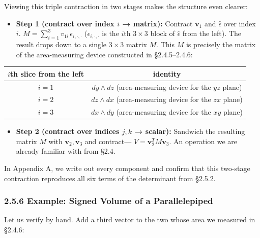 \documentclass[a4paper,12pt,openany]{book}
\providecommand{\tightlist}{%
  \setlength{\itemsep}{0pt}\setlength{\parskip}{0pt}}
\begin{document}
Viewing this triple contraction in two stages makes the structure even
clearer:

\begin{itemize}
\tightlist
\item
  \textbf{Step 1 (contract over index $i$ → matrix):} Contract
  \(\mathbf{v}_1\) and \(\widehat{\epsilon}\) over index \(i\).
  \(\displaystyle M = \sum_{i=1}^3 v_{1i}\,\epsilon_{i,\cdot,\cdot}\)
  (\(\epsilon_{i,\cdot,\cdot}\) is the \(i\)th \(3 \times 3\) block of
  \(\widehat{\epsilon}\) from the left). The result drops down to a
  single \(3 \times 3\) matrix \(M\). This \(M\) is precisely the matrix
  of the area-measuring device constructed in §2.4.5–2.4.6:
\end{itemize}

\begin{longtable}[]{@{}cc@{}}
\toprule\noalign{}
\(i\)th slice from the left & identity \\
\midrule\noalign{}
\endhead
\bottomrule\noalign{}
\endlastfoot
\(i=1\) & \(dy \wedge dz\) (area-measuring device for the \(yz\)
plane) \\
\(i=2\) & \(dz \wedge dx\) (area-measuring device for the \(zx\)
plane) \\
\(i=3\) & \(dx \wedge dy\) (area-measuring device for the \(xy\)
plane) \\
\end{longtable}

\begin{itemize}
\tightlist
\item
  \textbf{Step 2 (contract over indices $j,k$ → scalar):} Sandwich the
  resulting matrix \(M\) with \(\mathbf{v}_2, \mathbf{v}_3\) and
  contract— \(V = \mathbf{v}_2^T M \mathbf{v}_3\). An operation we are
  already familiar with from §2.4.
\end{itemize}

In Appendix A, we write out every component and confirm that this
two-stage contraction reproduces all six terms of the determinant from
§2.5.2.

\hypertarget{example-signed-volume-of-a-parallelepiped}{%
\subsubsection{2.5.6 Example: Signed Volume of a
Parallelepiped}\label{example-signed-volume-of-a-parallelepiped}}

Let us verify by hand. Add a third vector to the two whose area we
measured in §2.4.6:
\end{document}
